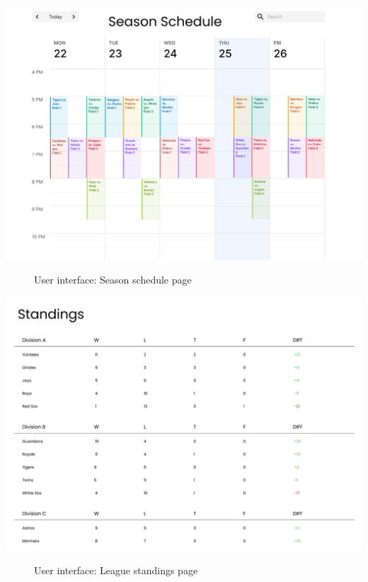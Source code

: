 \documentclass[12pt, titlepage]{article}
\begin{document}
\centering
\includegraphics[scale=0.6]{Figma1.png}
\begin{figure}[H]
\centering
\caption{User interface: Season schedule page}
\label{FigSS}
\end{figure}

\centering
\includegraphics[scale=0.5]{Figma2.png}
\begin{figure}[H]
\centering
\caption{User interface: League standings page}
\label{FigSS}
\end{figure}
\end{document}
